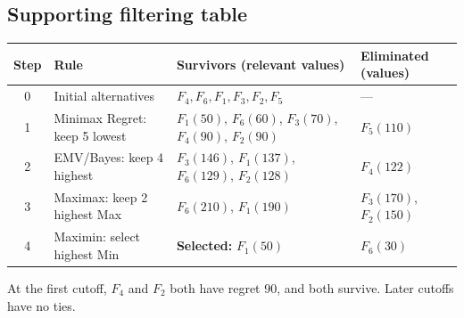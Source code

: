 \subsection*{Supporting filtering table}
\begin{center}\small
\begin{tabularx}{\textwidth}{@{}c >{\raggedright\arraybackslash}p{} >{\raggedright\arraybackslash}X >{\raggedright\arraybackslash}p{}@{}}
\toprule
Step & Rule & Survivors (relevant values) & Eliminated (values)\\\midrule
0 & Initial alternatives & $F_4,F_6,F_1,F_3,F_2,F_5$ & ---\\
1 & Minimax Regret: keep 5 lowest & $F_1(50)$, $F_6(60)$, $F_3(70)$, $F_4(90)$, $F_2(90)$ & $F_5(110)$\\
2 & EMV/Bayes: keep 4 highest & $F_3(146)$, $F_1(137)$, $F_6(129)$, $F_2(128)$ & $F_4(122)$\\
3 & Maximax: keep 2 highest Max & $F_6(210)$, $F_1(190)$ & $F_3(170)$, $F_2(150)$\\
4 & Maximin: select highest Min & \textbf{Selected:} $F_1(50)$ & $F_6(30)$\\
\bottomrule\end{tabularx}
\end{center}
At the first cutoff, $F_4$ and $F_2$ both have regret 90, and both survive. Later cutoffs have no ties.
\secInicio[sec:q4]

\label{sol:q4tree}
